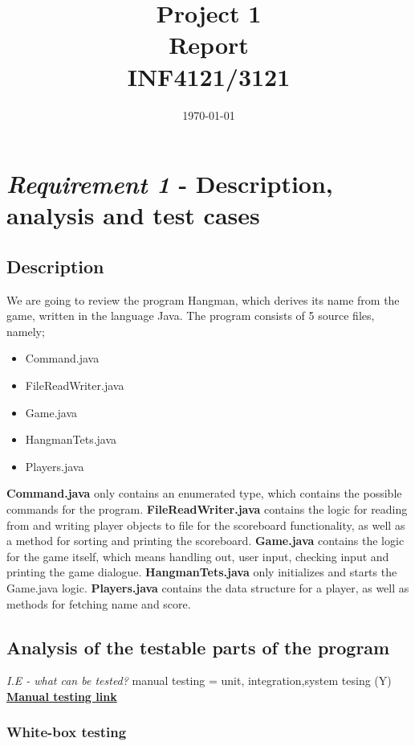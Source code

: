 \documentclass{article}
\title{Project 1 \\ Report \\ INF4121/3121} %
\date{\today} %
\begin{document}
\maketitle %

\section{\textit{Requirement 1} - Description, analysis and test cases}

\subsection{Description}
We are going to review the program Hangman, which derives its name from the game, written in the language Java. The program consists of 5 source files, namely;
\begin{itemize}
\item Command.java
\item FileReadWriter.java
\item Game.java
\item HangmanTets.java
\item Players.java
\end{itemize}

\textbf{Command.java} only contains an enumerated type, which contains the possible commands for the program. \textbf{FileReadWriter.java} contains the logic for reading from and writing player objects to file for the scoreboard functionality, as well as a method for sorting and printing the scoreboard. \textbf{Game.java} contains the logic for the game itself, which means handling out, user input, checking input and printing the game dialogue. \textbf{HangmanTets.java} only initializes and starts the Game.java logic. \textbf{Players.java} contains the data structure for a player, as well as methods for fetching name and score.

\subsection{Analysis of the testable parts of the program\newline}
\textit{I.E - what can be tested?\newline}
manual testing = unit, integration,system tesing (Y)
\href{https://en.wikipedia.org/wiki/Manual_testing}{\textbf{Manual testing link}}


\subsubsection{White-box testing}
\end{document}

